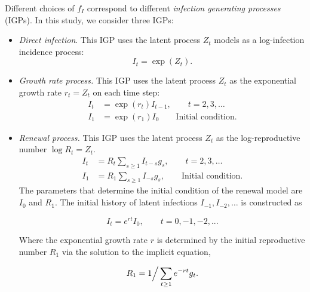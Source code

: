 \documentclass{getwriting}
\begin{document}
Different choices of $f_I$ correspond to different \emph{infection generating processes} (IGPs). In this study, we consider three IGPs:
\begin{itemize}
    \item \emph{Direct infection}. This IGP uses the latent process $Z_t$ models as a log-infection incidence process:   
\[I_t = \exp(Z_t).\]
    \item \emph{Growth rate process.} This IGP uses the latent process $Z_t$ as the exponential growth rate $r_t = Z_t$ on each time step:
    \begin{equation}
        \begin{split}
            I_t &= \exp(r_t) I_{t-1},\qquad t = 2, 3, \dots\\
            I_1 &= \exp(r_1) I_0\qquad \text{Initial condition.}
        \end{split}
    \end{equation}
    \item \emph{Renewal process.} This IGP uses the latent process $Z_t$ as the log-reproductive number $\log R_t = Z_t$.
    \begin{equation}
        \begin{split}
            I_t &= R_t \sum_{s \geq 1} I_{t-s} g_s,\qquad t = 2, 3, \dots\\
            I_1 &= R_1 \sum_{s \geq 1} I_{-s} g_s, \qquad \text{Initial condition.}
        \end{split}
    \end{equation}
    The parameters that determine the initial condition of the renewal model are $I_0$ and $R_1$. The initial history of latent infections $I_{-1}, I_{-2},\dots$ is constructed as

    \[I_t = e^{rt} I_0,\qquad t = 0, -1, -2,...\]

    Where the exponential growth rate $r$ is determined by the initial reproductive number $R_1$ via the solution to the implicit equation,

    \[R_1 = 1 \Big{/} \sum_{t\geq 1} e^{-rt} g_t.\]

\end{itemize}
\end{document}
